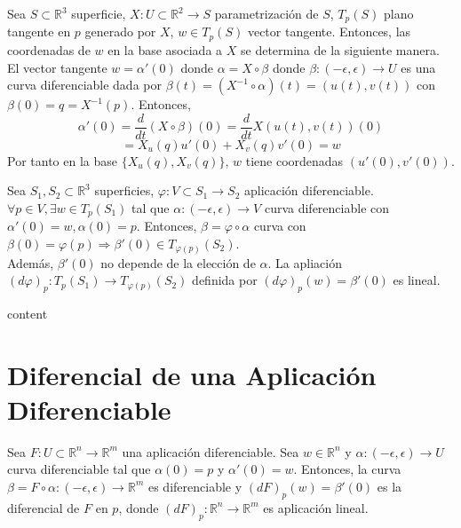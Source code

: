 \begin{ejm}
  Sea $S \subset \mathbb{R}^{3}$ superficie, $X : U \subset \mathbb{R}^{2} \to S$ parametrización de $S$, $T_{p}(S)$ plano tangente en $p$ generado por $X$, $w \in T_{p}(S)$ vector tangente. Entonces, las coordenadas de $w$ en la base asociada a $X$ se determina de la siguiente manera. \\

  El vector tangente $w = \alpha'(0)$ donde $\alpha = X \circ \beta$ donde $\beta : (-\epsilon, \epsilon) \to U$ es una curva diferenciable dada por $\beta(t) = (X^{-1} \circ \alpha) (t) = (u(t), v(t))$ con $\beta(0) = q = X^{-1}(p)$. Entonces,
  \[ 
    \alpha'(0) = \frac{d{}}{d{t}}(X \circ \beta)(0) = \frac{d{}}{d{t}}X(u(t), v(t))(0)
  \] 
  \[ 
    = X_{u}(q) u'(0) + X_{v}(q) v'(0) = w
  \] 
  Por tanto en la base $\{ X_{u}(q), X_{v}(q) \}$, $w$ tiene coordenadas $(u'(0), v'(0))$.
\end{ejm}

\begin{obs}
  Sea $S_{1}, S_{2} \subset \mathbb{R}^{3}$ superficies, $\varphi : V \subset S_{1} \to S_{2}$ aplicación diferenciable. $\forall p \in V, \exists w \in T_{p}(S_{1})$ tal que $\alpha : (-\epsilon, \epsilon) \to V$ curva diferenciable con $\alpha'(0) = w, \alpha(0) = p$. Entonces, $\beta = \varphi \circ \alpha$ curva con $\beta(0) = \varphi(p) \Rightarrow \beta'(0) \in T_{\varphi(p)}(S_{2})$.\\

  Además, $\beta'(0)$ no depende de la elección de $\alpha$. La apliación $(d \varphi)_{p} : T_{p}(S_{1}) \to T_{\varphi(p)}(S_{2})$ definida por $(d \varphi)_{p}(w) = \beta'(0)$ es lineal.
\end{obs}

\begin{defn}[Normal]
  content
\end{defn}

\section{Diferencial de una Aplicación Diferenciable}

\begin{defn}[Diferencial]
  Sea $F : U \subset \mathbb{R}^{n} \to \mathbb{R}^{m}$ una aplicación diferenciable. Sea $w \in \mathbb{R}^{n}$ y $\alpha : (-\epsilon, \epsilon) \to U$ curva diferenciable tal que $\alpha(0) = p$ y $\alpha'(0) = w$. Entonces, la curva $\beta = F \circ \alpha : (-\epsilon, \epsilon) \to \mathbb{R}^{m}$ es diferenciable y $(dF)_{p}(w) = \beta'(0)$ es la diferencial de $F$ en $p$, donde $(d F)_{p} : \mathbb{R}^{n} \to \mathbb{R}^{m} $ es aplicación lineal.
\end{defn}

